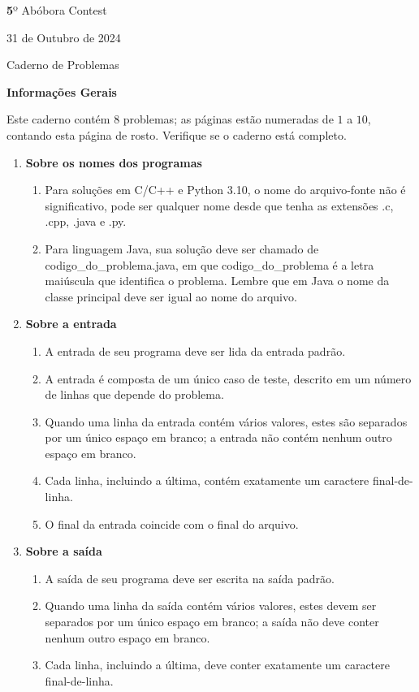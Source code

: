 
\begin{center}
 {\large {\textbf 
5º Abóbora Contest}}


{\large 31 de Outubro de 2024}

{\large  Caderno de Problemas}

{\large \textbf{Informações Gerais}}
\end{center}

Este caderno contém $8$ problemas; as páginas estão numeradas de $1$ a $10$,  contando esta página de rosto. Verifique se o caderno está completo.

\begin{enumerate}
    \item \textbf{Sobre os nomes dos programas}
    \begin{enumerate}
        \item Para soluções em C/C++ e Python 3.10, o nome do arquivo-fonte não é significativo, pode ser qualquer nome desde que tenha as extensões .c, .cpp, .java e .py.
        \item Para linguagem Java, sua solução deve ser chamado de codigo\_do\_problema.java, em que codigo\_do\_problema é a letra maiúscula que identifica o problema. Lembre que em Java o nome da classe principal deve ser igual ao nome do arquivo.
    \end{enumerate}
    \item \textbf{Sobre a entrada}
    \begin{enumerate}
        \item A entrada de seu programa deve ser lida da entrada padrão.
        \item A entrada é composta de um único caso de teste, descrito em um número de linhas que depende do problema.
        \item Quando uma linha da entrada contém vários valores, estes são separados por um único espaço em branco; a entrada não contém nenhum outro espaço em branco.
        \item Cada linha, incluindo a última, contém exatamente um caractere final-de-linha.
        \item O final da entrada coincide com o final do arquivo.
    \end{enumerate}
    \item \textbf{Sobre a saída}
    \begin{enumerate}
        \item A saída de seu programa deve ser escrita na saída padrão.
        \item Quando uma linha da saída contém vários valores, estes devem ser separados por um único espaço em branco; a saída não deve conter nenhum outro espaço em branco.
        \item Cada linha, incluindo a última, deve conter exatamente um caractere final-de-linha.
    \end{enumerate}
\end{enumerate}

\newpage